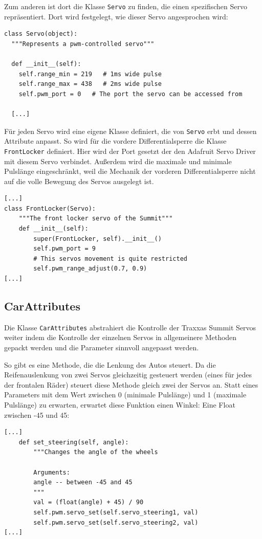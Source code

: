 \documentclass[a4paper,10pt]{scrartcl}
\begin{document}
    Zum anderen ist dort die Klasse \lstinline{Servo} zu finden, die einen
    spezifischen Servo repräsentiert.
    Dort wird festgelegt, wie dieser Servo angesprochen wird:
    \begin{lstlisting}
class Servo(object):
  """Represents a pwm-controlled servo"""

  def __init__(self):
    self.range_min = 219   # 1ms wide pulse
    self.range_max = 438   # 2ms wide pulse
    self.pwm_port = 0   # The port the servo can be accessed from

  [...]
    \end{lstlisting}

    Für jeden Servo wird eine eigene Klasse definiert, die von \lstinline{Servo}
    erbt und dessen Attribute anpasst.
    So wird für die vordere Differentialsperre die Klasse \lstinline{FrontLocker}
    definiert.
    Hier wird der Port gesetzt der den Adafruit Servo Driver mit diesem Servo
    verbindet.
    Außerdem wird die maximale und minimale Pulslänge eingeschränkt, weil die
    Mechanik der vorderen Differentialsperre nicht auf die volle Bewegung des
    Servos ausgelegt ist.
    \begin{lstlisting}
[...]
class FrontLocker(Servo):
    """The front locker servo of the Summit"""
    def __init__(self):
        super(FrontLocker, self).__init__()
        self.pwm_port = 9
        # This servos movement is quite restricted
        self.pwm_range_adjust(0.7, 0.9)
[...]
    \end{lstlisting}

  \subsection{CarAttributes}

    Die Klasse \lstinline{CarAttributes} abstrahiert die Kontrolle der Traxxas
    Summit Servos weiter indem die Kontrolle der einzelnen Servos in
    allgemeinere Methoden gepackt werden und die Parameter sinnvoll angepasst
    werden.

    So gibt es eine Methode, die die Lenkung des Autos steuert.
    Da die Reifenauslenkung von zwei Servos gleichzeitig gesteuert werden
    (eines für jedes der frontalen Räder) steuert diese Methode gleich zwei der
    Servos an.
    Statt eines Parameters mit dem Wert zwischen 0 (minimale Pulslänge) und 1
    (maximale Pulslänge) zu erwarten, erwartet diese Funktion einen Winkel:
    Eine Float zwischen -45 und 45:
    \begin{lstlisting}
[...]
    def set_steering(self, angle):
        """Changes the angle of the wheels

        Arguments:
        angle -- between -45 and 45
        """
        val = (float(angle) + 45) / 90
        self.pwm.servo_set(self.servo_steering1, val)
        self.pwm.servo_set(self.servo_steering2, val)
[...]
    \end{lstlisting}
\end{document}
